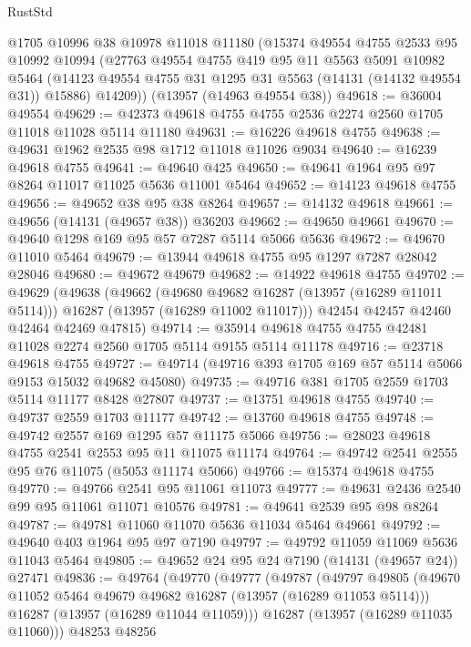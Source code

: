 \begin{lexlean}{RustStd}
\begin{coremodule}
    @1705
    @10996
    @38
    @10978
    @11018
    @11180
    (@15374
      @49554
      @4755
      @2533
      @95
      @10992
      @10994
      (@27763
        @49554
        @4755
        @419
        @95
        @11
        @5563
        @5091
        @10982
        @5464
        (@14123 @49554 @4755 @31 @1295 @31 @5563 (@14131 (@14132 @49554 @31)) @15886)
        @14209))
    (@13957 (@14963 @49554 @38))
@49618 := @36004 @49554
@49629 := @42373 @49618 @4755 @4755 @2536 @2274 @2560 @1705 @11018 @11028 @5114 @11180
@49631 := @16226 @49618 @4755
@49638 := @49631 @1962 @2535 @98 @1712 @11018 @11026 @9034
@49640 := @16239 @49618 @4755
@49641 := @49640 @425
@49650 := @49641 @1964 @95 @97 @8264 @11017 @11025 @5636 @11001 @5464
@49652 := @14123 @49618 @4755
@49656 := @49652 @38 @95 @38 @8264
@49657 := @14132 @49618
@49661 := @49656 (@14131 (@49657 @38)) @36203
@49662 := @49650 @49661
@49670 := @49640 @1298 @169 @95 @57 @7287 @5114 @5066 @5636
@49672 := @49670 @11010 @5464
@49679 := @13944 @49618 @4755 @95 @1297 @7287 @28042 @28046
@49680 := @49672 @49679
@49682 := @14922 @49618 @4755
@49702 := @49629
    (@49638
      (@49662
        (@49680 @49682 @16287 (@13957 (@16289 @11011 @5114)))
        @16287
        (@13957 (@16289 @11002 @11017)))
      @42454
      @42457
      @42460
      @42464
      @42469
      @47815)
@49714 := @35914 @49618 @4755 @4755 @42481 @11028 @2274 @2560 @1705 @5114 @9155 @5114 @11178
@49716 := @23718 @49618 @4755
@49727 := @49714 (@49716 @393 @1705 @169 @57 @5114 @5066 @9153 @15032 @49682 @45080)
@49735 := @49716 @381 @1705 @2559 @1703 @5114 @11177 @8428 @27807
@49737 := @13751 @49618 @4755
@49740 := @49737 @2559 @1703 @11177
@49742 := @13760 @49618 @4755
@49748 := @49742 @2557 @169 @1295 @57 @11175 @5066
@49756 := @28023 @49618 @4755 @2541 @2553 @95 @11 @11075 @11174
@49764 := @49742 @2541 @2555 @95 @76 @11075 (@5053 @11174 @5066)
@49766 := @15374 @49618 @4755
@49770 := @49766 @2541 @95 @11061 @11073
@49777 := @49631 @2436 @2540 @99 @95 @11061 @11071 @10576
@49781 := @49641 @2539 @95 @98 @8264
@49787 := @49781 @11060 @11070 @5636 @11034 @5464 @49661
@49792 := @49640 @403 @1964 @95 @97 @7190
@49797 := @49792 @11059 @11069 @5636 @11043 @5464
@49805 := @49652 @24 @95 @24 @7190 (@14131 (@49657 @24)) @27471
@49836 := @49764
    (@49770
      (@49777
        (@49787
          (@49797
            @49805
            (@49670 @11052 @5464 @49679 @49682 @16287 (@13957 (@16289 @11053 @5114)))
            @16287
            (@13957 (@16289 @11044 @11059)))
          @16287
          (@13957 (@16289 @11035 @11060)))
        @48253
        @48256

\end{coremodule}
\end{lexlean}
